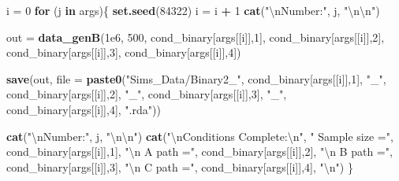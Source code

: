 \documentclass[]{DissertateCUNY}
\newenvironment{Shaded}{\begin{snugshade}}{\end{snugshade}}
\newcommand{\CharTok}[1]{\textcolor[rgb]{0.31,0.60,0.02}{#1}}
\newcommand{\ControlFlowTok}[1]{\textcolor[rgb]{0.13,0.29,0.53}{\textbf{#1}}}
\newcommand{\DataTypeTok}[1]{\textcolor[rgb]{0.13,0.29,0.53}{#1}}
\newcommand{\DecValTok}[1]{\textcolor[rgb]{0.00,0.00,0.81}{#1}}
\newcommand{\FloatTok}[1]{\textcolor[rgb]{0.00,0.00,0.81}{#1}}
\newcommand{\KeywordTok}[1]{\textcolor[rgb]{0.13,0.29,0.53}{\textbf{#1}}}
\newcommand{\NormalTok}[1]{#1}
\newcommand{\OperatorTok}[1]{\textcolor[rgb]{0.81,0.36,0.00}{\textbf{#1}}}
\newcommand{\StringTok}[1]{\textcolor[rgb]{0.31,0.60,0.02}{#1}}
\begin{document}
\begin{Shaded}
\begin{Highlighting}[]
\NormalTok{i =}\StringTok{ }\DecValTok{0}
\ControlFlowTok{for}\NormalTok{ (j }\ControlFlowTok{in}\NormalTok{ args)\{}
  \KeywordTok{set.seed}\NormalTok{(}\DecValTok{84322}\NormalTok{)}
\NormalTok{  i =}\StringTok{ }\NormalTok{i }\OperatorTok{+}\StringTok{ }\DecValTok{1}
  \KeywordTok{cat}\NormalTok{(}\StringTok{"}\CharTok{\textbackslash{}n}\StringTok{Number:"}\NormalTok{, j, }\StringTok{"}\CharTok{\textbackslash{}n\textbackslash{}n}\StringTok{"}\NormalTok{)}
  
\NormalTok{  out =}\StringTok{ }\KeywordTok{data_genB}\NormalTok{(}\FloatTok{1e6}\NormalTok{, }\DecValTok{500}\NormalTok{, }
\NormalTok{                  cond_binary[args[[i]],}\DecValTok{1}\NormalTok{], }
\NormalTok{                  cond_binary[args[[i]],}\DecValTok{2}\NormalTok{], }
\NormalTok{                  cond_binary[args[[i]],}\DecValTok{3}\NormalTok{], }
\NormalTok{                  cond_binary[args[[i]],}\DecValTok{4}\NormalTok{])}
  
  \KeywordTok{save}\NormalTok{(out, }\DataTypeTok{file =} \KeywordTok{paste0}\NormalTok{(}\StringTok{"Sims_Data/Binary2_"}\NormalTok{, }
\NormalTok{                          cond_binary[args[[i]],}\DecValTok{1}\NormalTok{], }\StringTok{"_"}\NormalTok{,}
\NormalTok{                          cond_binary[args[[i]],}\DecValTok{2}\NormalTok{], }\StringTok{"_"}\NormalTok{,}
\NormalTok{                          cond_binary[args[[i]],}\DecValTok{3}\NormalTok{], }\StringTok{"_"}\NormalTok{,}
\NormalTok{                          cond_binary[args[[i]],}\DecValTok{4}\NormalTok{], }\StringTok{".rda"}\NormalTok{))}
  
  \KeywordTok{cat}\NormalTok{(}\StringTok{"}\CharTok{\textbackslash{}n}\StringTok{Number:"}\NormalTok{, j, }\StringTok{"}\CharTok{\textbackslash{}n\textbackslash{}n}\StringTok{"}\NormalTok{)}
  \KeywordTok{cat}\NormalTok{(}\StringTok{"}\CharTok{\textbackslash{}n}\StringTok{Conditions Complete:}\CharTok{\textbackslash{}n}\StringTok{"}\NormalTok{,}
      \StringTok{" Sample size ="}\NormalTok{, cond_binary[args[[i]],}\DecValTok{1}\NormalTok{], }
      \StringTok{"}\CharTok{\textbackslash{}n}\StringTok{  A path      ="}\NormalTok{, cond_binary[args[[i]],}\DecValTok{2}\NormalTok{], }
      \StringTok{"}\CharTok{\textbackslash{}n}\StringTok{  B path      ="}\NormalTok{, cond_binary[args[[i]],}\DecValTok{3}\NormalTok{], }
      \StringTok{"}\CharTok{\textbackslash{}n}\StringTok{  C path      ="}\NormalTok{, cond_binary[args[[i]],}\DecValTok{4}\NormalTok{], }\StringTok{"}\CharTok{\textbackslash{}n}\StringTok{"}\NormalTok{)}
\NormalTok{\}}
\end{Highlighting}
\end{Shaded}
\end{document}
